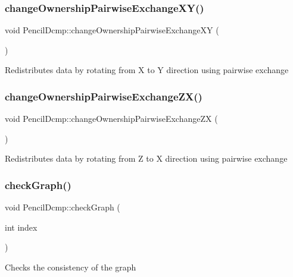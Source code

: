 \subsubsection{\texorpdfstring{change\+Ownership\+Pairwise\+Exchange\+X\+Y()}{changeOwnershipPairwiseExchangeXY()}}
{\footnotesize\ttfamily void Pencil\+Dcmp\+::change\+Ownership\+Pairwise\+Exchange\+XY (\begin{DoxyParamCaption}{ }\end{DoxyParamCaption})}

Redistributes data by rotating from X to Y direction using pairwise exchange \mbox{\label{classPencilDcmp_a2f2e64944e0f8587c7a6f02532b11fc5}} 
\subsubsection{\texorpdfstring{change\+Ownership\+Pairwise\+Exchange\+Z\+X()}{changeOwnershipPairwiseExchangeZX()}}
{\footnotesize\ttfamily void Pencil\+Dcmp\+::change\+Ownership\+Pairwise\+Exchange\+ZX (\begin{DoxyParamCaption}{ }\end{DoxyParamCaption})}

Redistributes data by rotating from Z to X direction using pairwise exchange \mbox{\label{classPencilDcmp_acbb1930609563f24d408fb2a5766400b}} 
\subsubsection{\texorpdfstring{check\+Graph()}{checkGraph()}}
{\footnotesize\ttfamily void Pencil\+Dcmp\+::check\+Graph (\begin{DoxyParamCaption}\item[{int}]{index }\end{DoxyParamCaption})}

Checks the consistency of the graph \mbox{\label{classPencilDcmp_aa0dfe19263f66b6c4c9bf73705d62b15}} 

